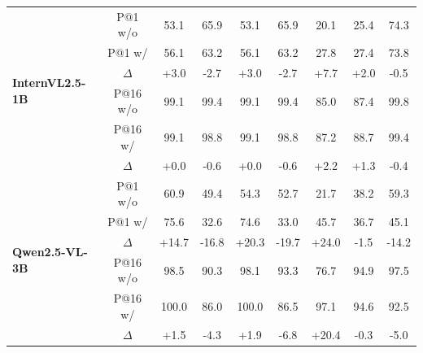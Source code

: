 \documentclass{article}
\begin{document}
\begin{table}[h]
{\begin{tabular}{l c | cc cc | ccc}
\multirow{6}{*}{\textbf{InternVL2.5-1B}}
 & P@1 w/o & 53.1 & 65.9 & 53.1 & 65.9 & 20.1 & 25.4 & 74.3 \\
 & P@1 w/  & 56.1 & 63.2 & 56.1 & 63.2 & 27.8 & 27.4 & 73.8 \\
 & $\Delta$
   & \cellcolor{blue!15}+3.0  & \cellcolor{red!15}-2.7
   & \cellcolor{blue!15}+3.0  & \cellcolor{red!15}-2.7
   & \cellcolor{blue!15}+7.7 & \cellcolor{blue!15}+2.0
   & \cellcolor{red!15}-0.5 \\
\cmidrule{2-9}
 & P@16 w/o & 99.1 & 99.4 & 99.1 & 99.4 & 85.0 & 87.4 & 99.8 \\
 & P@16 w/  & 99.1 & 98.8 & 99.1 & 98.8 & 87.2 & 88.7 & 99.4 \\
 & $\Delta$
   & \cellcolor{blue!15}+0.0  & \cellcolor{red!15}-0.6
   & \cellcolor{blue!15}+0.0  & \cellcolor{red!15}-0.6
   & \cellcolor{blue!15}+2.2 & \cellcolor{blue!15}+1.3
   & \cellcolor{red!15}-0.4 \\
\midrule

\multirow{6}{*}{\textbf{Qwen2.5-VL-3B}}
 & P@1 w/o & 60.9 & 49.4 & 54.3 & 52.7 & 21.7 & 38.2 & 59.3 \\
 & P@1 w/  & 75.6 & 32.6 & 74.6 & 33.0 & 45.7 & 36.7 & 45.1 \\
 & $\Delta$
   & \cellcolor{blue!15}+14.7 & \cellcolor{red!15}-16.8
   & \cellcolor{blue!15}+20.3 & \cellcolor{red!15}-19.7
   & \cellcolor{blue!15}+24.0 & \cellcolor{red!15}-1.5
   & \cellcolor{red!15}-14.2 \\
\cmidrule{2-9}
 & P@16 w/o & 98.5 & 90.3 & 98.1 & 93.3 & 76.7 & 94.9 & 97.5 \\
 & P@16 w/  & 100.0 & 86.0 & 100.0 & 86.5 & 97.1 & 94.6 & 92.5 \\
 & $\Delta$
   & \cellcolor{blue!15}+1.5  & \cellcolor{red!15}-4.3
   & \cellcolor{blue!15}+1.9  & \cellcolor{red!15}-6.8
   & \cellcolor{blue!15}+20.4 & \cellcolor{red!15}-0.3
   & \cellcolor{red!15}-5.0 \\
\midrule


\end{tabular}}
\end{table}
\end{document}
